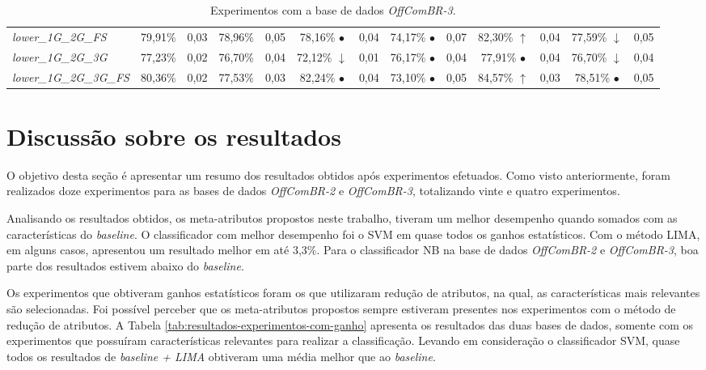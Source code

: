 \begin{table}[h]
{\begin{tabular}{l|cccc|cccc|cccc}
\textit{lower\_1G\_2G\_FS} & 79,91\% & 0,03 & 78,96\% & 0,05 & 78,16\% $\bullet$ & 0,04 & 74,17\% $\bullet$ & 0,07 & 82,30\% $\uparrow$ & 0,04 & 77,59\% $\downarrow$ & 0,05 \\
\textit{lower\_1G\_2G\_3G} & 77,23\% & 0,02 & 76,70\% & 0,04 & 72,12\% $\downarrow$ & 0,01 & 76,17\% $\bullet$ & 0,04 & 77,91\% $\bullet$ & 0,04 & 76,70\% $\downarrow$ & 0,04 \\
\textit{lower\_1G\_2G\_3G\_FS} & 80,36\% & 0,02 & 77,53\% & 0,03 & 82,24\% $\bullet$ & 0,04 & 73,10\% $\bullet$ & 0,05 & 84,57\% $\uparrow$ & 0,03 & 78,51\% $\bullet$ & 0,05 \\ \hline
\end{tabular}
    }
    \caption{Experimentos com a base de dados {\it OffComBR-3}.}\label{tab:resultados-experimentos-br3}
\end{table}

\section{Discussão sobre os resultados}
O objetivo desta seção é apresentar um resumo dos resultados obtidos após experimentos efetuados. Como visto anteriormente, foram realizados doze experimentos para as bases de dados {\it OffComBR-2} e {\it OffComBR-3}, totalizando vinte e quatro experimentos. 

Analisando os resultados obtidos, os meta-atributos propostos neste trabalho, tiveram um melhor desempenho quando somados com as características do {\it baseline}. O classificador com melhor desempenho foi o SVM em quase todos os ganhos estatísticos. Com o método LIMA, em alguns casos, apresentou um resultado melhor em até 3,3\%. Para o classificador NB na base de dados {\it OffComBR-2} e {\it OffComBR-3}, boa parte dos resultados estivem abaixo do {\it baseline}.

Os experimentos que obtiveram ganhos estatísticos foram os que utilizaram redução de atributos, na qual, as características mais relevantes são selecionadas. Foi possível perceber que os meta-atributos propostos sempre estiveram presentes nos experimentos com o método de redução de atributos. A Tabela \ref{tab:resultados-experimentos-com-ganho} apresenta os resultados das duas bases de dados, somente com os experimentos que possuíram características relevantes para realizar a classificação. Levando em consideração o classificador SVM, quase todos os resultados de {\it baseline + LIMA} obtiveram uma média melhor que ao {\it baseline}.

